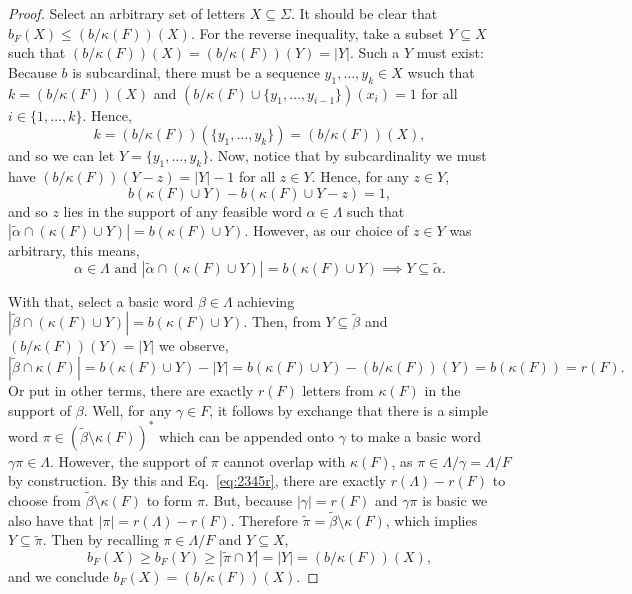 \documentclass[11pt]{article}
\newcommand{\univ}{\Sigma}
\newcommand{\glang}{\Lambda}
\begin{document}
\begin{proof}
    Select an arbitrary set of letters $X\subseteq \univ$.
    It should be clear that $b_F(X) \leq (b/\kappa(F))(X)$.
    For the reverse inequality, take a subset $Y\subseteq X$ such that $(b/\kappa(F))(X) = (b/\kappa(F))(Y) = |Y|$.
    Such a $Y$ must exist:
    Because $b$ is subcardinal, there must be a sequence $y_1,\ldots, y_k\in X$ wsuch that $k = (b/\kappa(F))(X)$ and $(b/\kappa(F) \cup \{y_1,\ldots,y_{i-1}\})(x_i) = 1$ for all $i \in \{1,\ldots, k\}$.
    Hence,
    \[
        k = (b/\kappa(F))(\{y_1,\ldots,y_k\}) = (b/\kappa(F))(X),
    \]
    and so we can let $Y = \{y_1,\ldots, y_k\}$.
    Now, notice that by subcardinality we must have $(b/\kappa(F))(Y-z) = |Y|-1$ for all $z \in Y$.
    Hence, for any $z \in Y$,
    \[
        b(\kappa(F)\cup Y) - b(\kappa(F)\cup Y - z) = 1,
    \]
    and so $z$ lies in the support of any feasible word $\alpha \in \glang$ such that $|\widetilde{\alpha} \cap (\kappa(F)\cup Y)| = b(\kappa(F) \cup Y)$.
    However, as our choice of $z\in Y$ was arbitrary, this means,
    \[
        \alpha\in\glang\text{ and }|\widetilde{\alpha} \cap (\kappa(F)\cup Y)| = b(\kappa(F) \cup Y) \implies Y \subseteq \widetilde{\alpha}.
    \]

    With that, select a basic word $\beta \in \glang$ achieving $|\widetilde{\beta} \cap (\kappa(F)\cup Y)| = b(\kappa(F) \cup Y)$.
    Then, from $Y\subseteq \widetilde{\beta}$ and $(b/\kappa(F))(Y) = |Y|$ we observe,
    \begin{equation}\label{eq:2345r}
        |\widetilde{\beta}\cap \kappa(F)| = b(\kappa(F)\cup Y) - |Y| =b(\kappa(F)\cup Y) - (b/\kappa(F))(Y) =  b(\kappa(F)) = r(F).
    \end{equation}
    Or put in other terms, there are exactly $r(F)$ letters from $\kappa(F)$ in the support of $\beta$.
    Well, for any $\gamma \in F$, it follows by exchange that there is a simple word $\pi \in (\widetilde{\beta} \setminus \kappa(F))^*$ which can be appended onto $\gamma$ to make a basic word $\gamma\pi \in \glang$.
    However, the support of $\pi$ cannot overlap with $\kappa(F)$, as $\pi \in \glang/\gamma=\glang/F$ by construction.
    By this and Eq.~\ref{eq:2345r}, there are exactly $r(\glang)-r(F)$ to choose from $\widetilde{\beta}\setminus\kappa(F)$ to form $\pi$.
    But, because $|\gamma| = r(F)$ and $\gamma\pi$ is basic we also have that $|\pi| = r(\glang)-r(F)$.
    Therefore $\widetilde{\pi} = \widetilde{\beta}\setminus\kappa(F)$, which implies $Y \subseteq \widetilde{\pi}$.
    Then by recalling $\pi \in  \glang/F$ and $Y\subseteq X$,
    \[
        b_F(X) \geq b_F(Y) \geq |\widetilde{\pi} \cap Y| = |Y| = (b/\kappa(F))(X),
    \]
    and we conclude $b_F(X) = (b/\kappa(F))(X)$.
\end{proof}
\end{document}
